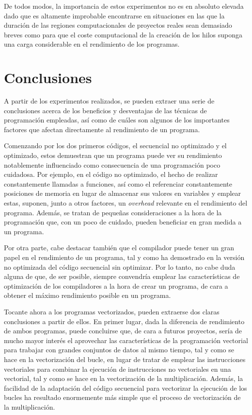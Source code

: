 \documentclass[conference]{IEEEtran}
\begin{document}
De todos modos, la importancia de estos experimentos no es en absoluto elevada dado que es altamente improbable encontrarse en situaciones en las que la duración de las regiones computacionales de proyectos reales sean demasiado breves como para que el coste computacional de la creación de los hilos suponga una carga considerable en el rendimiento de los programas.

\section{Conclusiones}\label{conclusiones}

A partir de los experimentos realizados, se pueden extraer una serie de conclusiones acerca de los beneficios y desventajas de las técnicas de programación empleadas, así como de cuáles son algunos de los importantes factores que afectan directamente al rendimiento de un programa.

Comenzando por los dos primeros códigos, el secuencial no optimizado y el optimizado, estos demuestran que un programa puede ver su rendimiento notablemente influenciado como consecuencia de una programación poco cuidadosa. Por ejemplo, en el código no optimizado, el hecho de realizar constantemente llamadas a funciones, así como el referenciar constantemente posiciones de memoria en lugar de almacenar sus valores en variables y emplear estas, suponen, junto a otros factores, un \textit{overhead} relevante en el rendimiento del programa. Además, se tratan de pequeñas consideraciones a la hora de la programación que, con un poco de cuidado, pueden beneficiar en gran medida a un programa.

Por otra parte, cabe destacar también que el compilador puede tener un gran papel en el rendimiento de un programa, tal y como ha demostrado en la versión no optimizada del código secuencial sin optimizar. Por lo tanto, no cabe duda alguna de que, de ser posible, siempre convendría emplear las características de optimización de los compiladores a la hora de crear un programa, de cara a obtener el máximo rendimiento posible en un programa.

Tocante ahora a los programas vectorizados, pueden extraerse dos claras conclusiones a partir de ellos. En primer lugar, dada la diferencia de rendimiento de ambos programas, puede concluirse que, de cara a futuros proyectos, sería de mucho mayor interés el aprovechar las características de la programación vectorial para trabajar con grandes conjuntos de datos al mismo tiempo, tal y como se hace en la vectorización del bucle, en lugar de tratar de emplear las instrucciones vectoriales para combinar la ejecución de instrucciones no vectoriales en una vectorial, tal y como se hace en la vectorización de la multiplicación. Además, la facilidad de la adaptación del código secuencial para vectorizar la ejecución de los bucles ha resultado enormemente más simple que el proceso de vectorización de la multiplicación.
\end{document}
